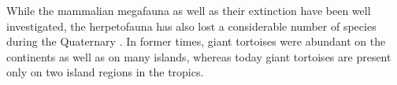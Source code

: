 
While the mammalian megafauna as well as their extinction %
have been well investigated, the herpetofauna has also lost a considerable number of species during the Quaternary \citep{Blain2016}. In former times, giant tortoises were abundant on the continents as well as on many islands, whereas today giant tortoises are present only on two island regions in the tropics.










